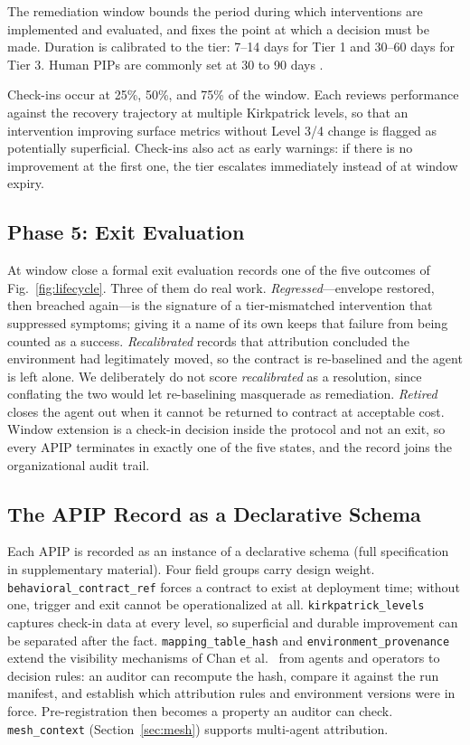 \documentclass[conference]{IEEEtran}
\newcommand{\code}[1]{\texttt{\small #1}}
\begin{document}
The remediation window bounds the period during which interventions are
implemented and evaluated, and fixes the point at which a decision must be
made. Duration is calibrated to the tier: 7--14 days for Tier 1 and 30--60 days
for Tier 3. Human PIPs are commonly set at 30 to 90 days \cite{shrm2023}.

Check-ins occur at 25\%, 50\%, and 75\% of the window. Each reviews performance
against the recovery trajectory at multiple Kirkpatrick levels, so that an
intervention improving surface metrics without Level 3/4 change is flagged as
potentially superficial. Check-ins also act as early warnings: if there is no
improvement at the first one, the tier escalates immediately instead of at
window expiry.

\subsection{Phase 5: Exit Evaluation}
\label{sec:exit}

At window close a formal exit evaluation records one of the five outcomes of
Fig.~\ref{fig:lifecycle}. Three of them do real work. \emph{Regressed}---envelope
restored, then breached again---is the signature of a tier-mismatched
intervention that suppressed symptoms; giving it a name of its own keeps that
failure from being counted as a success. \emph{Recalibrated} records that
attribution concluded the environment had legitimately moved, so the contract
is re-baselined and the agent is left alone. We deliberately do not score
\emph{recalibrated} as a resolution, since conflating the two would let
re-baselining masquerade as remediation. \emph{Retired} closes the agent out
when it cannot be returned to contract at acceptable cost. Window extension is
a check-in decision inside the protocol and not an exit, so every APIP
terminates in exactly one of the five states, and the record joins the
organizational audit trail.

\subsection{The APIP Record as a Declarative Schema}
\label{sec:schema}

Each APIP is recorded as an instance of a declarative schema (full
specification in supplementary material). Four field groups carry design
weight. \code{behavioral\_contract\_ref} forces a contract to exist at
deployment time; without one, trigger and exit cannot be operationalized at
all. \code{kirkpatrick\_levels} captures check-in data at every level, so
superficial and durable improvement can be separated after the fact.
\code{mapping\_table\_hash} and \code{environment\_provenance} extend the
visibility mechanisms of Chan et al.\ \cite{chan2024} from agents and operators
to decision rules: an auditor can recompute the hash, compare it against the
run manifest, and establish which attribution rules and environment versions
were in force. Pre-registration then becomes a property an auditor can check.
\code{mesh\_context} (Section~\ref{sec:mesh}) supports multi-agent attribution.
\end{document}
